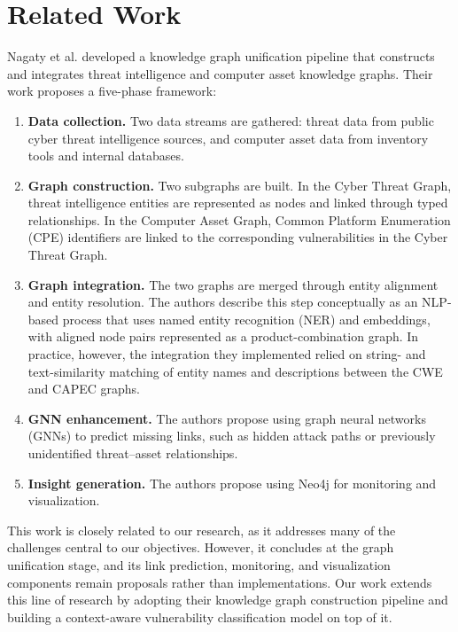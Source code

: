 \documentclass[conference]{IEEEtran}
\begin{document}
\section{Related Work}

Nagaty et al. \cite{b1} developed a knowledge graph unification pipeline that constructs and integrates threat intelligence and computer asset knowledge graphs. Their work proposes a five-phase framework:

\begin{enumerate}
    \item \textbf{Data collection.} Two data streams are gathered: threat data from public cyber threat intelligence sources, and computer asset data from inventory tools and internal databases.
    \item \textbf{Graph construction.} Two subgraphs are built. In the Cyber Threat Graph, threat intelligence entities are represented as nodes and linked through typed relationships. In the Computer Asset Graph, Common Platform Enumeration (CPE) identifiers are linked to the corresponding vulnerabilities in the Cyber Threat Graph.
    \item \textbf{Graph integration.} The two graphs are merged through entity alignment and entity resolution. The authors describe this step conceptually as an NLP-based process that uses named entity recognition (NER) and embeddings, with aligned node pairs represented as a product-combination graph. In practice, however, the integration they implemented relied on string- and text-similarity matching of entity names and descriptions between the CWE and CAPEC graphs.
    \item \textbf{GNN enhancement.} The authors propose using graph neural networks (GNNs) to predict missing links, such as hidden attack paths or previously unidentified threat–asset relationships.
    \item \textbf{Insight generation.} The authors propose using Neo4j for monitoring and visualization.
\end{enumerate}
This work is closely related to our research, as it addresses many of the challenges central to our objectives. However, it concludes at the graph unification stage, and its link prediction, monitoring, and visualization components remain proposals rather than implementations. Our work extends this line of research by adopting their knowledge graph construction pipeline and building a context-aware vulnerability classification model on top of it.
\end{document}
